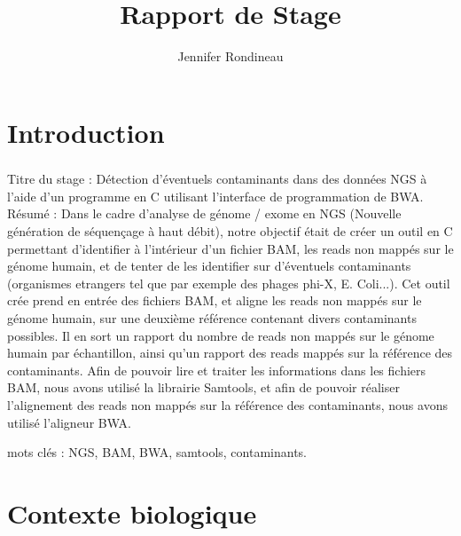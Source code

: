 \documentclass[a4paper,french,10pt]{memoir}
\title{Rapport de Stage}
\author{Jennifer Rondineau}
\begin{document}
 
\frontmatter %
\chapter{Introduction}
\paragraph{}
Titre du stage : Détection d'éventuels contaminants dans des données NGS à l'aide d'un programme en C utilisant l'interface de programmation de BWA. \\

Résumé : 
Dans le cadre d'analyse de génome / exome en NGS (Nouvelle génération de séquençage à haut débit), notre objectif était de créer un outil en C permettant d'identifier à l'intérieur d'un fichier BAM, les reads non mappés sur le génome humain, et de tenter de les identifier sur d'éventuels contaminants (organismes etrangers tel que par exemple des phages phi-X, E. Coli...). Cet outil crée prend en entrée des fichiers BAM, et aligne les reads non mappés sur le génome humain, sur une deuxième référence contenant divers contaminants possibles. Il en sort un rapport du nombre de reads non mappés sur le génome humain par échantillon, ainsi qu'un rapport des reads mappés sur la référence des contaminants. Afin de pouvoir lire et traiter les informations dans les fichiers BAM, nous avons utilisé la librairie Samtools, et afin de pouvoir réaliser l'alignement des reads non mappés sur la référence des contaminants, nous avons utilisé l'aligneur BWA. 

mots clés : NGS, BAM, BWA, samtools, contaminants. 
 
\clearpage %
\setcounter{tocdepth}{1} %
\renewcommand{\contentsname}{Sommaire} %
\tableofcontents{} %
 
\mainmatter %
\chapter{Contexte biologique}
\paragraph{}
\end{document}
